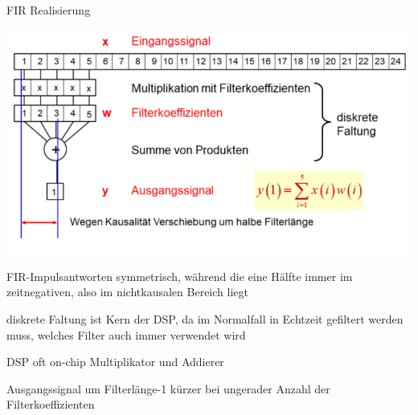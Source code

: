 \documentclass[a4paper]{article}
\begin{document}
\begin{multicols}{3}
  FIR Realisierung
  \begin{itemize*}
    \item \includegraphics[width=.5\linewidth]{Assets/Biosignalverarbeitung-fir-realisierung.png}
    \item FIR-Impulsantworten symmetrisch, während die eine Hälfte immer im zeitnegativen, also im nichtkausalen Bereich liegt%
    \item diskrete Faltung ist Kern der DSP, da im Normalfall in Echtzeit gefiltert werden muss, welches Filter auch immer verwendet wird
    \item DSP oft on-chip Multiplikator und Addierer
    \item Ausgangssignal um Filterlänge-1 kürzer bei ungerader Anzahl der Filterkoeffizienten
  \end{itemize*}


\end{multicols}
\end{document}
